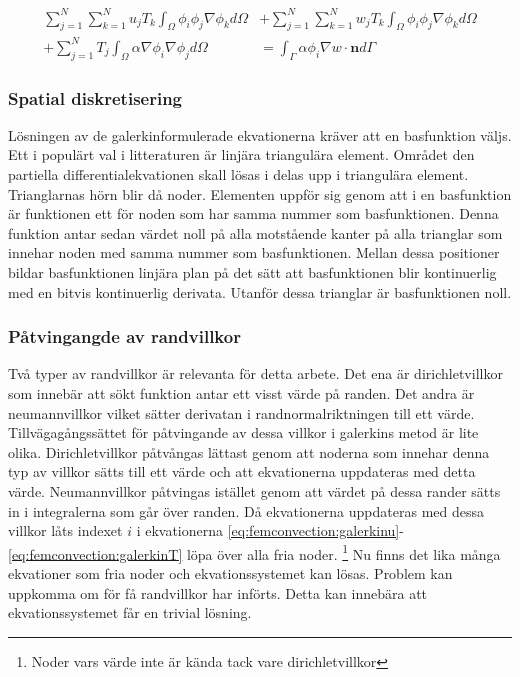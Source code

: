 \begin{align}
\label{eq:femconvection:galerkinT}
\sum^N_{j=1}\sum^N_{k=1}u_jT_k\int_\Omega \phi_i\phi_j\nabla\phi_k d\Omega &+
\sum^N_{j=1}\sum^N_{k=1}w_jT_k\int_\Omega \phi_i\phi_j\nabla\phi_k d\Omega \\ +
\nonumber
\sum^N_{j=1} T_j \int_\Omega \alpha\nabla\phi_i\nabla\phi_j d\Omega &=
\int_\Gamma \alpha\phi_i\nabla w \cdot \mathbf{n} d\Gamma
\end{align}

\subsubsection{Spatial diskretisering}

Lösningen av de galerkinformulerade ekvationerna kräver att en basfunktion väljs.
Ett i populärt val i litteraturen är linjära triangulära element. Området den
partiella differentialekvationen skall lösas i delas upp i triangulära element.
Trianglarnas hörn blir då noder. Elementen uppför sig genom att i en basfunktion
är funktionen ett för noden som har samma nummer som basfunktionen. Denna funktion
antar sedan värdet noll på alla motstående kanter på alla trianglar som innehar noden
med samma nummer som basfunktionen. Mellan dessa positioner bildar basfunktionen
linjära plan på det sätt att basfunktionen blir kontinuerlig med en bitvis kontinuerlig
derivata.
Utanför dessa trianglar är basfunktionen noll. \cite{johnson2009} 

\subsubsection{Påtvingangde av randvillkor}

Två typer av randvillkor är relevanta för detta arbete. Det ena är dirichletvillkor som
innebär att sökt funktion antar ett visst värde på randen. Det andra är neumannvillkor 
vilket sätter derivatan i randnormalriktningen till ett värde. Tillvägagångssättet
för påtvingande av dessa villkor i galerkins metod är lite olika. Dirichletvillkor
påtvångas lättast genom att noderna som innehar denna typ av villkor sätts till ett värde
och att ekvationerna uppdateras med detta värde. Neumannvillkor påtvingas istället
genom att värdet på dessa rander sätts in i integralerna som går över randen. Då ekvationerna
uppdateras med dessa villkor låts indexet $i$ i ekvationerna
\eqref{eq:femconvection:galerkinu}-\eqref{eq:femconvection:galerkinT} löpa över alla fria noder.
\footnote{Noder vars värde inte är kända tack vare dirichletvillkor} Nu finns det
lika många ekvationer som fria noder och ekvationssystemet kan lösas. Problem
kan uppkomma om för få randvillkor har införts. Detta kan innebära att ekvationssystemet
får en trivial lösning.
